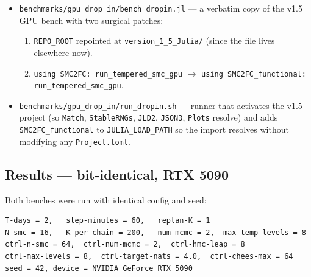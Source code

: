 \documentclass[11pt,a4paper]{article}
\begin{document}
\begin{itemize}[leftmargin=*]
\item \texttt{benchmarks/gpu\_drop\_in/bench\_dropin.jl} --- a verbatim
copy of the v1.5 GPU bench with two surgical patches:
    \begin{enumerate}[leftmargin=*]
    \item \texttt{REPO\_ROOT} repointed at \texttt{version\_1\_5\_Julia/}
        (since the file lives elsewhere now).
    \item \texttt{using SMC2FC: run\_tempered\_smc\_gpu}
        $\rightarrow$
        \texttt{using SMC2FC\_functional: run\_tempered\_smc\_gpu}.
    \end{enumerate}
\item \texttt{benchmarks/gpu\_drop\_in/run\_dropin.sh} --- runner that
activates the v1.5 project (so \texttt{Match}, \texttt{StableRNGs},
\texttt{JLD2}, \texttt{JSON3}, \texttt{Plots} resolve) and adds
\texttt{SMC2FC\_functional} to \texttt{JULIA\_LOAD\_PATH} so the
import resolves without modifying any \texttt{Project.toml}.
\end{itemize}

\subsection{Results --- bit-identical, RTX 5090}

Both benches were run with identical config and seed:

\begin{verbatim}
T-days = 2,   step-minutes = 60,   replan-K = 1
N-smc = 16,   K-per-chain = 200,   num-mcmc = 2,  max-temp-levels = 8
ctrl-n-smc = 64,  ctrl-num-mcmc = 2,  ctrl-hmc-leap = 8
ctrl-max-levels = 8,  ctrl-target-nats = 4.0,  ctrl-chees-max = 64
seed = 42, device = NVIDIA GeForce RTX 5090
\end{verbatim}
\end{document}
